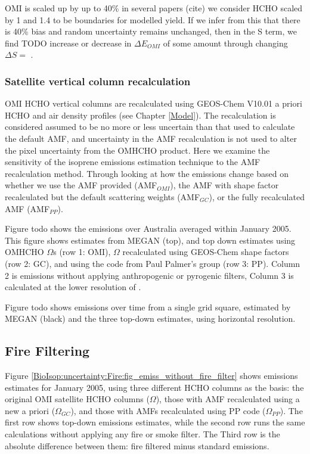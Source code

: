       OMI is scaled up by up to 40\% in several papers (cite) we consider HCHO scaled by 1 and 1.4 to be boundaries for modelled yield.
      If we infer from this that there is 40\% bias and random uncertainty remains unchanged, then in the S term, we find TODO increase or decrease in $\Delta{E_{OMI}}$ of some amount through changing $\Delta{S}=$ .
    
    
    \subsubsection{Satellite vertical column recalculation}
      \label{BioIsop:uncertainty:Satellite:AMF}
      OMI HCHO vertical columns are recalculated using GEOS-Chem V10.01 a priori HCHO and air density profiles (see Chapter \ref{Model}).
      The recalculation is considered assumed to be no more or less uncertain than that used to calculate the default AMF, and uncertainty in the AMF recalculation is not used to alter the pixel uncertainty from the OMHCHO product.
      Here we examine the sensitivity of the isoprene emissions estimation technique to the AMF recalculation method.
      Through looking at how the emissions change based on whether we use the AMF provided (AMF$_{OMI}$), the AMF with shape factor recalculated but the default scattering weights (AMF$_{GC}$), or the fully recalculated AMF (AMF$_{PP}$).
      
      Figure todo shows the emissions over Australia averaged within January 2005.
      This figure shows estimates from MEGAN (top), and top down estimates using OMHCHO $\Omega$s (row 1: OMI), $\Omega$ recalculated using GEOS-Chem shape factors (row 2: GC), and using the code from Paul Palmer's group (row 3: PP).
      Column 2 is emissions without applying anthropogenic or pyrogenic filters, Column 3 is calculated at the lower resolution of \lowhr.
      
      Figure todo shows emissions over time from a single grid square, estimated by MEGAN (black) and the three top-down estimates, using \lowhr horizontal resolution.
  
  \subsection{Fire Filtering}
    
    Figure \ref{BioIsop:uncertainty:Fire:fig_emiss_without_fire_filter} shows emissions estimates for January 2005, using three different HCHO columns as the basis: the original OMI satellite HCHO columns ($\Omega$), those with AMF recalculated using a new a priori ($\Omega_{GC}$), and those with AMFs recalculated using PP code ($\Omega_{PP}$).
    The first row shows top-down emissions estimates, while the second row runs the same calculations without applying any fire or smoke filter.
    The Third row is the absolute difference between them: fire filtered minus standard emissions.
    
